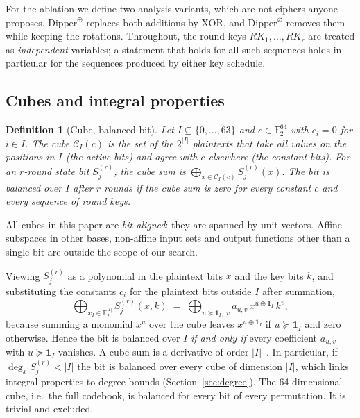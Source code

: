 \documentclass[pdflatex,sn-mathphys-num]{sn-jnl}
\theoremstyle{thmstyleone}
\theoremstyle{thmstylethree}
\newtheorem{definition}{Definition}
\theoremstyle{thmstyletwo}
\newcommand{\Ftwo}{\mathbb{F}_2}
\begin{document}
For the ablation we define two analysis variants, which are not ciphers anyone proposes. $\mathrm{Dipper}^{\oplus}$ replaces both additions by XOR, and $\mathrm{Dipper}^{\varnothing}$ removes them while keeping the rotations. Throughout, the round keys $RK_1,\dots,RK_r$ are treated as \emph{independent} variables; a statement that holds for all such sequences holds in particular for the sequences produced by either key schedule.

\subsection{Cubes and integral properties}
\begin{definition}[Cube, balanced bit]
Let $I\subseteq\{0,\dots,63\}$ and $c\in\Ftwo^{64}$ with $c_i=0$ for $i\in I$. The \emph{cube} $\mathcal C_I(c)$ is the set of the $2^{|I|}$ plaintexts that take all values on the positions in $I$ (the active bits) and agree with $c$ elsewhere (the constant bits). For an $r$-round state bit $S^{(r)}_j$, the \emph{cube sum} is $\bigoplus_{x\in\mathcal C_I(c)}S^{(r)}_j(x)$. The bit is \emph{balanced over $I$ after $r$ rounds} if the cube sum is zero for every constant $c$ and every sequence of round keys.
\end{definition}
All cubes in this paper are \emph{bit-aligned}: they are spanned by unit vectors. Affine subspaces in other bases, non-affine input sets and output functions other than a single bit are outside the scope of our search.

Viewing $S^{(r)}_j$ as a polynomial in the plaintext bits $x$ and the key bits $k$, and substituting the constants $c_i$ for the plaintext bits outside $I$ after summation,
\begin{equation}\label{eq:cubesum}
\bigoplus_{x_I\in\Ftwo^{|I|}} S^{(r)}_j(x,k)\;=\;\bigoplus_{u\succeq \mathbf 1_I,\;v} a_{u,v}\,x^{u\oplus\mathbf 1_I}\,k^{v},
\end{equation}
because summing a monomial $x^u$ over the cube leaves $x^{u\oplus\mathbf 1_I}$ if $u\succeq\mathbf 1_I$ and zero otherwise. Hence the bit is balanced over $I$ \emph{if and only if} every coefficient $a_{u,v}$ with $u\succeq\mathbf 1_I$ vanishes. A cube sum is a derivative of order $|I|$~\cite{lai1994}. In particular, if $\deg_x S^{(r)}_j<|I|$ the bit is balanced over every cube of dimension $|I|$, which links integral properties to degree bounds (Section~\ref{sec:degree}). The 64-dimensional cube, i.e.\ the full codebook, is balanced for every bit of every permutation. It is trivial and excluded.
\end{document}
